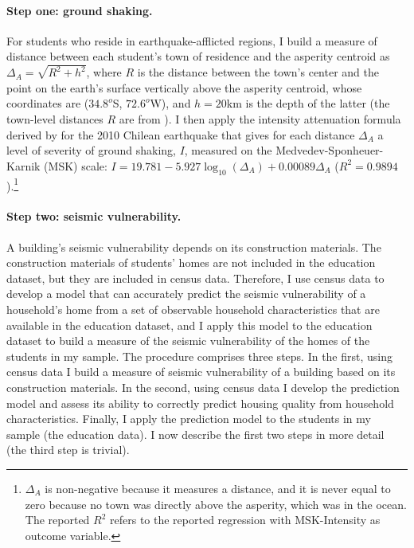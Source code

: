  \paragraph{Step one: ground shaking.} For students who reside in earthquake-afflicted regions, I build a measure of distance between each student's town of residence and the asperity centroid as $\Delta_A=\sqrt{R^2+h^2}$, where $R$ is the distance between the town's center and the point on the earth's surface vertically above the asperity centroid, whose coordinates are ($34.8^{o}$S, $72.6^{o}$W), and $h=20$km is the depth of the latter (the town-level distances $R$ are from \cite{tincani_distance_measures}). I then apply the intensity attenuation formula derived by \cite{astroza2012} for the 2010 Chilean earthquake that gives for each distance $\Delta_A$ a level of severity of ground shaking, $I$, measured on the Medvedev-Sponheuer-Karnik (MSK) scale: $I=19.781-5.927\log_{10}(\Delta_A)+0.00089\Delta_A$ ($R^2=0.9894$).\footnote{$\Delta_A$ is non-negative because it measures a distance, and it is never equal to zero because no town was directly above the asperity, which was in the ocean. The reported $R^2$ refers to the reported regression with MSK-Intensity as outcome variable. }\par 
 

\paragraph{Step two: seismic vulnerability.} A building's seismic vulnerability depends on its construction materials. The construction materials of students' homes are not included in the education dataset, but they are included in census data. Therefore, I use census data to develop a model that can accurately predict the seismic vulnerability of a household's home from a set of observable household characteristics that are available in the education dataset, and I apply this model to the education dataset to build a measure of the seismic vulnerability of the homes of the students in my sample. The procedure comprises three steps. In the first, using census data I build a measure of seismic vulnerability of a building based on its construction materials. In the second, using census data I develop the prediction model and assess its ability to correctly predict housing quality from household characteristics. Finally, I apply the prediction model to the students in my sample (the education data). I now describe the first two steps in more detail (the third step is trivial).  \par 


